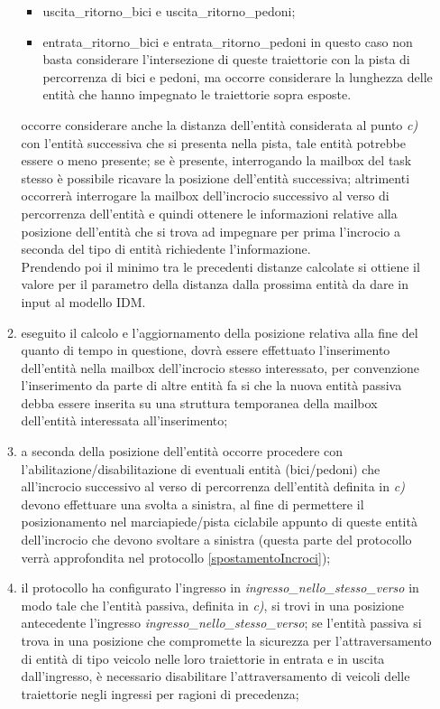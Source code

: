 \begin{enumerate}
\begin{enumerate}
\begin{itemize}
\item usci\-ta\_ri\-tor\-no\_bi\-ci e usci\-ta\_ri\-tor\-no\_pe\-do\-ni;
\item en\-tra\-ta\_ritorno\_bici e en\-tra\-ta\_ri\-tor\-no\_pe\-do\-ni in questo caso non basta considerare l'intersezione di queste traiettorie con la pista di percorrenza di bici e pedoni, ma occorre considerare la lunghezza delle entità che hanno impegnato le traiettorie sopra esposte.
\end{itemize}
occorre considerare anche la distanza dell'entità considerata al punto \textit{c)} con l'entità successiva che si presenta nella pista, tale entità potrebbe essere o meno presente; se è presente, interrogando la mailbox del task stesso è possibile ricavare la posizione dell'entità successiva; altrimenti occorrerà interrogare la mailbox dell'incrocio successivo al verso di percorrenza dell'entità e quindi ottenere le informazioni relative alla posizione dell'entità che si trova ad impegnare per prima l'incrocio a seconda del tipo di entità richiedente l'informazione.\\
Prendendo poi il minimo tra le precedenti distanze calcolate si ottiene il valore per il parametro della distanza dalla prossima entità da dare in input al modello IDM.
\item eseguito il calcolo e l'aggiornamento della posizione relativa alla fine del quanto di tempo in questione, dovrà essere effettuato l'inserimento dell'entità nella mailbox dell'incrocio stesso interessato, per convenzione l'inserimento da parte di altre entità fa si che la nuova entità passiva debba essere inserita su una struttura temporanea della mailbox dell'entità interessata all'inserimento;
\item a seconda della posizione dell'entità occorre procedere con l'abilitazione/disabilitazione di eventuali entità (bici/pedoni) che all'incrocio successivo al verso di percorrenza dell'entità definita in \textit{c)} devono effettuare una svolta a sinistra, al fine di permettere il posizionamento nel marciapiede/pista ciclabile appunto di queste entità dell'incrocio che devono svoltare a sinistra (questa parte del protocollo verrà approfondita nel protocollo \ref{spostamentoIncroci});
\item il protocollo ha configurato l'ingresso in \textit{ingres\-so\_nel\-lo\_stes\-so\_ver\-so} in modo tale che l'entità passiva, definita in \textit{c)}, si trovi in una posizione antecedente l'ingresso \textit{ingres\-so\_nel\-lo\_stes\-so\_ver\-so}; se l'entità passiva si trova in una posizione che compromette la sicurezza per l'attraversamento di entità di tipo veicolo nelle loro traiettorie in entrata e in uscita dall'ingresso, è necessario disabilitare l'attraversamento di veicoli delle traiettorie negli ingressi per ragioni di precedenza;

\end{enumerate}
\end{enumerate}
